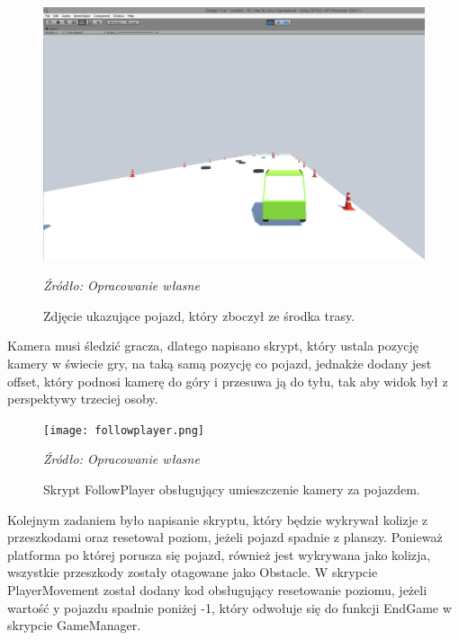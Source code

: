 \begin{figure}[!h]
\centering
  \includegraphics[width=0.75\linewidth]{playermovelook.png}
  \caption{Zdjęcie ukazujące pojazd, który zboczył ze środka trasy.}\label{rys_5}
  \begin{minipage}[t]{0.75\linewidth}
    \emph{Źródło: Opracowanie własne}
  \end{minipage}
\end{figure}

\newpage
\indent Kamera musi śledzić gracza, dlatego napisano skrypt, który ustala pozycję kamery w świecie gry, na taką samą pozycję co pojazd, jednakże dodany jest offset, który podnosi kamerę do góry i przesuwa ją do tyłu, tak aby widok był z perspektywy trzeciej osoby.

\begin{figure}[!h]
\centering
  \texttt{[image: followplayer.png]}
  \caption{Skrypt FollowPlayer obsługujący umieszczenie kamery za pojazdem.}\label{rys_6}
  \begin{minipage}[t]{0.75\linewidth}
    \emph{Źródło: Opracowanie własne}
  \end{minipage}
\end{figure}

\indent Kolejnym zadaniem było napisanie skryptu, który będzie wykrywał kolizje z przeszkodami oraz resetował poziom, jeżeli pojazd spadnie z planszy. Ponieważ platforma po której porusza się pojazd, również jest wykrywana jako kolizja, wszystkie przeszkody zostały otagowane jako Obstacle. W skrypcie PlayerMovement został dodany kod obsługujący resetowanie poziomu, jeżeli wartość y pojazdu spadnie poniżej -1, który odwołuje się do funkcji EndGame w skrypcie GameManager.

